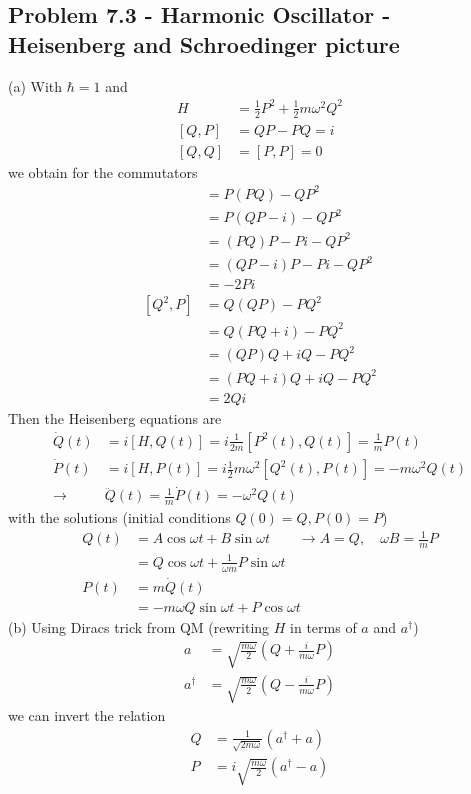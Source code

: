 \documentclass[../main.tex]{subfiles}
\begin{document}
\subsection{Problem 7.3 - Harmonic Oscillator  - Heisenberg and Schroedinger picture}
(a) With $\hbar=1$ and
\begin{align}
H&=\frac{1}{2}P^2+\frac{1}{2}m\omega^2Q^2\\
[Q,P]&=QP-PQ=i\\
[Q,Q]&=[P,P]=0
\end{align}
we obtain for the commutators
\begin{align}
[P^2,Q]
&=P(PQ)-QP^2\\
&=P(QP-i)-QP^2\\
&=(PQ)P-Pi-QP^2\\
&=(QP-i)P-Pi-QP^2\\
&=-2Pi\\
[Q^2,P]
&=Q(QP)-PQ^2\\
&=Q(PQ+i)-PQ^2\\
&=(QP)Q+iQ-PQ^2\\
&=(PQ+i)Q+iQ-PQ^2\\
&=2Qi
\end{align}
Then the Heisenberg equations are
\begin{align}
\dot Q(t)&=i[H,Q(t)]=i\frac{1}{2m}[P^2(t),Q(t)]=\frac{1}{m}P(t)\\
\dot P(t)&=i[H,P(t)]=i\frac{1}{2}m\omega^2[Q^2(t),P(t)]=-m\omega^2Q(t)\\
\rightarrow &\ddot Q(t)=\frac{1}{m}\dot P(t)=-\omega^2 Q(t)
\end{align}
with the solutions (initial conditions $Q(0)=Q, P(0)=P$)
\begin{align}
Q(t)&=A\cos\omega t+B\sin\omega t\qquad\rightarrow A=Q,\quad\omega B=\frac{1}{m}P\\
&=Q\cos\omega t+\frac{1}{\omega m}P\sin\omega t\\
P(t)&=m\dot Q(t)\\
&=-m\omega Q\sin\omega t+P\cos\omega t
\end{align}
(b) Using Diracs trick from QM (rewriting $H$ in terms of $a$ and $a^\dagger$)
\begin{align}
a&=\sqrt{\frac{m\omega}{2}}(Q+\frac{i}{m\omega}P)\\
a^\dagger&=\sqrt{\frac{m\omega}{2}}(Q-\frac{i}{m\omega}P)
\end{align}
we can invert the relation
\begin{align}
Q&=\frac{1}{\sqrt{2m\omega}}(a^\dagger+a)\\
P&=i\sqrt{\frac{m\omega}{2}}(a^\dagger-a)
\end{align}
\end{document}
